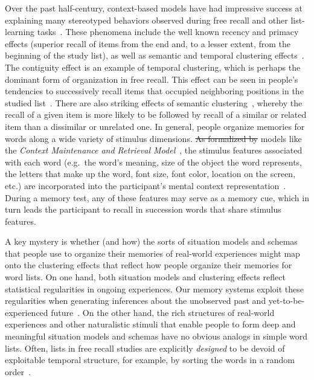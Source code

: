 \documentclass[11pt]{article}
\providecommand{\DIFaddtex}[1]{{\protect\color{blue}\uwave{#1}}} %
\providecommand{\DIFdeltex}[1]{{\protect\color{red}\sout{#1}}}                      %
\providecommand{\DIFaddbegin}{} %
\providecommand{\DIFaddend}{} %
\providecommand{\DIFdelbegin}{} %
\providecommand{\DIFdelend}{} %
\providecommand{\DIFadd}[1]{\texorpdfstring{\DIFaddtex{#1}}{#1}} %
\providecommand{\DIFdel}[1]{\texorpdfstring{\DIFdeltex{#1}}{}} %
\newcommand{\DIFscaledelfig}{0.5}
\newlength{\DIFdelgraphicswidth} %
\newlength{\DIFdelgraphicsheight} %
\newcommand{\DIFaddincludegraphics}[2][]{{\color{blue}\fbox{\DIFOincludegraphics[#1]{#2}}}} %
\newcommand{\DIFdelincludegraphics}[2][]{%
\sbox{\DIFdelgraphicsbox}{\DIFOincludegraphics[#1]{#2}}%
\settoboxwidth{\DIFdelgraphicswidth}{\DIFdelgraphicsbox} %
\settoboxtotalheight{\DIFdelgraphicsheight}{\DIFdelgraphicsbox} %
\scalebox{\DIFscaledelfig}{%
\parbox[b]{\DIFdelgraphicswidth}{\usebox{\DIFdelgraphicsbox}\\[-\baselineskip] \rule{\DIFdelgraphicswidth}{0em}}\llap{\resizebox{\DIFdelgraphicswidth}{\DIFdelgraphicsheight}{%
\setlength{\unitlength}{\DIFdelgraphicswidth}%
\begin{picture}(1,1)%
\thicklines\linethickness{2pt} %
{\color[rgb]{1,0,0}\put(0,0){\framebox(1,1){}}}%
{\color[rgb]{1,0,0}\put(0,0){\line( 1,1){1}}}%
{\color[rgb]{1,0,0}\put(0,1){\line(1,-1){1}}}%
\end{picture}%
}\hspace*{3pt}}} %
} %
\DeclareRobustCommand{\DIFaddbegin}{\DIFOaddbegin \let\includegraphics\DIFaddincludegraphics} %
\DeclareRobustCommand{\DIFaddend}{\DIFOaddend \let\includegraphics\DIFOincludegraphics} %
\DeclareRobustCommand{\DIFdelbegin}{\DIFOdelbegin \let\includegraphics\DIFdelincludegraphics} %
\DeclareRobustCommand{\DIFdelend}{\DIFOaddend \let\includegraphics\DIFOincludegraphics} %
\begin{document}
Over the past half-century, context-based models have had impressive success at
explaining many stereotyped behaviors observed during free recall and other
list-learning tasks~\citep{Este55a, RaaiShif80, GlenEtal83, HowaKaha02a,
SiroEtal05, KimbEtal07, PolyKaha08, SedeEtal08, PolyEtal09, ShanHowa12}. These
phenomena include the well known recency and primacy effects (superior recall
of items from the end and, to a lesser extent, from the beginning of the study
list), as well as semantic and temporal clustering effects~\citep{KahaEtal08b,
HowaKaha02b}. The contiguity effect is an example of temporal clustering, which
is perhaps the dominant form of organization in free recall. This effect can be
seen in people's tendencies to successively recall items that occupied
neighboring positions in the studied list~\citep{Kaha96}. There are also
striking effects of semantic clustering~\citep{RomnEtal93, Bous53, BousEtal54,
JenkRuss52, MannKaha12}, whereby the recall of a given item is more likely to
be followed by recall of a similar or related item than a dissimilar or
unrelated one. In general, people organize memories for words along a wide
variety of stimulus dimensions. \DIFdelbegin \DIFdel{As formalized by }\DIFdelend \DIFaddbegin \DIFadd{According to }\DIFaddend models like the
\textit{Context Maintenance and Retrieval Model}~\citep{PolyEtal09}, the
stimulus features associated with each word (e.g.\ the word's meaning, size of
the object the word represents, the letters that make up the word, font size,
font color, location on the screen, etc.) are incorporated into the
participant's mental context representation~\citep{SmitVela01, MannEtal11,
MannEtal12, MannEtal15, Mann20}. During a memory test, any of these features
may serve as a memory cue, which in turn leads the participant to recall in
succession words that share stimulus features.


A key mystery is whether (and how) the sorts of situation models and schemas
that people use to organize their memories of real-world experiences might map
onto the clustering effects that reflect how people organize their memories for
word lists. On one hand, both situation models and clustering effects reflect
statistical regularities in ongoing experiences. Our memory systems exploit
these regularities when generating inferences about the unobserved past and
yet-to-be-experienced future~\citep{XuEtal23, SchaTurk15, RangRitc12,
BoweEtal79, MomeEtal17}. On the other hand, the rich structures of real-world
experiences and other naturalistic stimuli that enable people to form deep and
meaningful situation models and schemas have no obvious analogs in simple word
lists. Often, lists in free recall studies are explicitly \textit{designed} to
be devoid of exploitable temporal structure, for example, by sorting the words
in a random order~\citep{Kaha12}.
\end{document}
